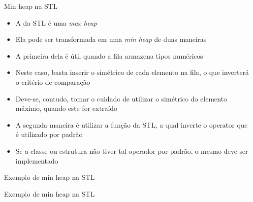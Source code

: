 \begin{frame}[fragile]{Min heap na STL}

    \begin{itemize}
        \item A  da STL é uma \textit{max heap}

        \item Ela pode ser transformada em uma \textit{min heap} de duas maneiras

        \item A primeira dela é útil quando a fila armazena tipos numéricos

        \item Neste caso, basta inserir o simétrico de cada elemento na fila, o que inverterá
            o critério de comparação

        \item Deve-se, contudo, tomar o cuidado de utilizar o simétrico do elemento máximo,
            quando este for extraído

        \item A segunda maneira é utilizar a função  da STL, a qual inverte
            o operator  que é utilizado por padrão

        \item Se a classe ou estrutura não tiver tal operador por padrão, o mesmo deve ser
            implementado
    \end{itemize}

\end{frame}

\begin{frame}[fragile]{Exemplo de min heap na STL}
\end{frame}

\begin{frame}[fragile]{Exemplo de min heap na STL}
\end{frame}
